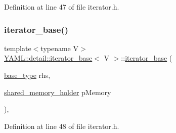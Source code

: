 Definition at line 47 of file iterator.\+h.

\mbox{\label{class_y_a_m_l_1_1detail_1_1iterator__base_ae90ad3867f31a1992564eb56dd6d51bd}} 
\subsubsection{\texorpdfstring{iterator\_base()}{iterator\_base()}\hspace{0.1cm}{\footnotesize\ttfamily [2/3]}}
{\footnotesize\ttfamily template$<$typename V$>$ \\
\mbox{\hyperlink{class_y_a_m_l_1_1detail_1_1iterator__base}{Y\+A\+M\+L\+::detail\+::iterator\+\_\+base}}$<$ V $>$\+::\mbox{\hyperlink{class_y_a_m_l_1_1detail_1_1iterator__base}{iterator\+\_\+base}} (\begin{DoxyParamCaption}\item[{\mbox{\hyperlink{class_y_a_m_l_1_1detail_1_1node__iterator__base}{base\+\_\+type}}}]{rhs,  }\item[{\mbox{\hyperlink{namespace_y_a_m_l_1_1detail_a228c4b3b6ba1058b474d40afc218e21d}{shared\+\_\+memory\+\_\+holder}}}]{p\+Memory }\end{DoxyParamCaption})\hspace{0.3cm}{\ttfamily [inline]}, {\ttfamily [explicit]}}



Definition at line 48 of file iterator.\+h.

\mbox{\label{class_y_a_m_l_1_1detail_1_1iterator__base_a070ff6c447740a54fca23da72e749362}} 
